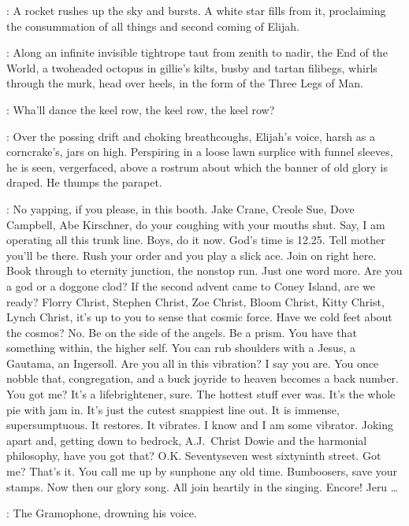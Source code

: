 :
A rocket rushes up the sky and bursts.
A white star fills from it,
proclaiming the consummation of all things and second coming of Elijah.

:
Along an infinite invisible tightrope taut from zenith to nadir,
the End of the World, a twoheaded octopus in gillie's kilts,
busby and tartan filibegs, whirls through the murk,
head over heels, in the form of the Three Legs of Man.

\EndOfWorld:
Wha'll dance the keel row, the keel row, the keel row?

:
Over the possing drift and choking breathcoughs,
Elijah's voice, harsh as a corncrake's, jars on high.
Perspiring in a loose lawn surplice with funnel sleeves, he is seen,
vergerfaced, above a rostrum about which the banner of old glory is draped.
He thumps the parapet.

\Elijah:
No yapping, if you please, in this booth.
Jake Crane, Creole Sue, Dove Campbell, Abe Kirschner,
do your coughing with your mouths shut.
Say, I am operating all this trunk line.
Boys, do it now.
God's time is 12.25.
Tell mother you'll be there.
Rush your order and you play a slick ace.
Join on right here.
Book through to eternity junction, the nonstop run.
Just one word more.
Are you a god or a doggone clod?
If the second advent came to Coney Island, are we ready?
Florry Christ, Stephen Christ, Zoe Christ, Bloom Christ, Kitty Christ, Lynch Christ,
it's up to you to sense that cosmic force.
Have we cold feet about the cosmos?
No. Be on the side of the angels.
Be a prism.
You have that something within, the higher self.
You can rub shoulders with a Jesus, a Gautama, an Ingersoll.
Are you all in this vibration?
I say you are.
You once nobble that, congregation,
and a buck joyride to heaven becomes a back number.
You got me?
It's a lifebrightener, sure.
The hottest stuff ever was.
It's the whole pie with jam in.
It's just the cutest snappiest line out.
It is immense, supersumptuous.
It restores.
It vibrates.
I know and I am some vibrator.
Joking apart and, getting down to bedrock, A.J.~Christ Dowie
and the harmonial philosophy, have you got that?
O.K.
Seventyseven west sixtyninth street.
Got me?
That's it.
You call me up by sunphone any old time.
Bumboosers, save your stamps.
Now then our glory song.
All join heartily in the singing.
Encore!
Jeru \ldots

:
The Gramophone, drowning his voice.


